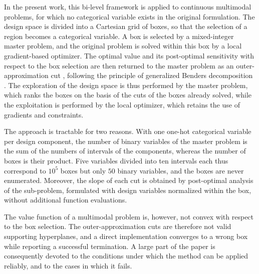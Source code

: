 \documentclass[pdflatex,sn-basic]{sn-jnl}
\begin{document}
In the present work, this bi-level framework is applied to continuous
multimodal problems, for which no categorical variable exists in the original
formulation. The design space is divided into a Cartesian grid of boxes, so that
the selection of a region becomes a categorical variable. A box is selected by a mixed-integer
master problem, and the original problem is solved within this box by a local
gradient-based optimizer. The optimal value and its post-optimal sensitivity
with respect to the box selection are then returned to the master problem as an
outer-approximation cut \citep{duran1986,fletcher1994}, following the principle
of generalized Benders decomposition \citep{benders1962,geoffrion1972}. The
exploration of the design space is thus performed by the master problem, which
ranks the boxes on the basis of the cuts of the boxes already solved, while the
exploitation is performed by the local optimizer, which retains the use of
gradients and constraints.

The approach is tractable for two reasons. With one one-hot categorical variable
per design component, the number of binary variables of the master problem is
the sum of the numbers of intervals of the components, whereas the number of
boxes is their product. Five variables divided into ten intervals each thus
correspond to $10^5$ boxes but only $50$ binary variables, and the boxes are
never enumerated. Moreover, the slope of each cut is obtained by post-optimal analysis of the
sub-problem, formulated with design variables normalized within the box, without
additional function evaluations.

The value function of a multimodal problem is, however, not convex with respect
to the box selection. The outer-approximation cuts are therefore not valid
supporting hyperplanes, and a direct implementation converges to a wrong box
while reporting a successful termination. A large part of the paper is
consequently devoted to the conditions under which the method can be applied
reliably, and to the cases in which it fails.
\end{document}
